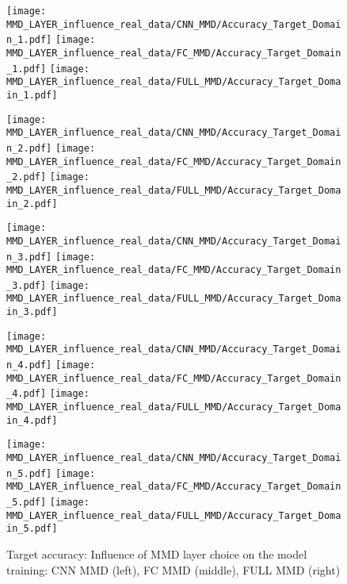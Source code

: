 \begin{figure}[H]
  \centering

  \texttt{[image: MMD\_LAYER\_influence\_real\_data/CNN\_MMD/Accuracy\_Target\_Domain\_1.pdf]}
  \hspace{.1cm}
  \texttt{[image: MMD\_LAYER\_influence\_real\_data/FC\_MMD/Accuracy\_Target\_Domain\_1.pdf]}
  \hspace{.1cm}
  \texttt{[image: MMD\_LAYER\_influence\_real\_data/FULL\_MMD/Accuracy\_Target\_Domain\_1.pdf]}

  \vspace{.3cm}

  \texttt{[image: MMD\_LAYER\_influence\_real\_data/CNN\_MMD/Accuracy\_Target\_Domain\_2.pdf]}
  \hspace{.1cm}
  \texttt{[image: MMD\_LAYER\_influence\_real\_data/FC\_MMD/Accuracy\_Target\_Domain\_2.pdf]}
  \hspace{.1cm}
  \texttt{[image: MMD\_LAYER\_influence\_real\_data/FULL\_MMD/Accuracy\_Target\_Domain\_2.pdf]}

  \vspace{.3cm}

  \texttt{[image: MMD\_LAYER\_influence\_real\_data/CNN\_MMD/Accuracy\_Target\_Domain\_3.pdf]}
  \hspace{.1cm}
  \texttt{[image: MMD\_LAYER\_influence\_real\_data/FC\_MMD/Accuracy\_Target\_Domain\_3.pdf]}
  \hspace{.1cm}
  \texttt{[image: MMD\_LAYER\_influence\_real\_data/FULL\_MMD/Accuracy\_Target\_Domain\_3.pdf]}
  
    \vspace{.3cm}

  \texttt{[image: MMD\_LAYER\_influence\_real\_data/CNN\_MMD/Accuracy\_Target\_Domain\_4.pdf]}
  \hspace{.1cm}
  \texttt{[image: MMD\_LAYER\_influence\_real\_data/FC\_MMD/Accuracy\_Target\_Domain\_4.pdf]}
  \hspace{.1cm}
  \texttt{[image: MMD\_LAYER\_influence\_real\_data/FULL\_MMD/Accuracy\_Target\_Domain\_4.pdf]}
  
    \vspace{.3cm}
    
  \texttt{[image: MMD\_LAYER\_influence\_real\_data/CNN\_MMD/Accuracy\_Target\_Domain\_5.pdf]}
  \hspace{.1cm}
  \texttt{[image: MMD\_LAYER\_influence\_real\_data/FC\_MMD/Accuracy\_Target\_Domain\_5.pdf]}
  \hspace{.1cm}
  \texttt{[image: MMD\_LAYER\_influence\_real\_data/FULL\_MMD/Accuracy\_Target\_Domain\_5.pdf]}


  \caption{Target accuracy: Influence of MMD layer choice on the model training: CNN MMD (left), FC MMD (middle), FULL MMD (right)}
  \label{fig:target_accuracy_MMD_layer}
\end{figure}


